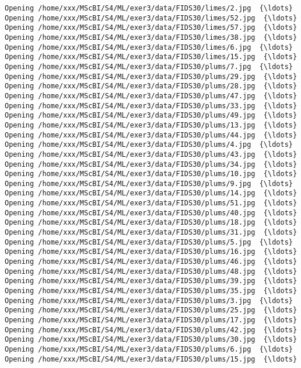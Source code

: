\documentclass[11pt]{article}
\begin{document}
\begin{Verbatim}[commandchars=\\\{\}]
Opening /home/xxx/MScBI/S4/ML/exer3/data/FIDS30/limes/2.jpg  {\ldots}
Opening /home/xxx/MScBI/S4/ML/exer3/data/FIDS30/limes/52.jpg  {\ldots}
Opening /home/xxx/MScBI/S4/ML/exer3/data/FIDS30/limes/57.jpg  {\ldots}
Opening /home/xxx/MScBI/S4/ML/exer3/data/FIDS30/limes/38.jpg  {\ldots}
Opening /home/xxx/MScBI/S4/ML/exer3/data/FIDS30/limes/6.jpg  {\ldots}
Opening /home/xxx/MScBI/S4/ML/exer3/data/FIDS30/limes/15.jpg  {\ldots}
Opening /home/xxx/MScBI/S4/ML/exer3/data/FIDS30/plums/7.jpg  {\ldots}
Opening /home/xxx/MScBI/S4/ML/exer3/data/FIDS30/plums/29.jpg  {\ldots}
Opening /home/xxx/MScBI/S4/ML/exer3/data/FIDS30/plums/28.jpg  {\ldots}
Opening /home/xxx/MScBI/S4/ML/exer3/data/FIDS30/plums/47.jpg  {\ldots}
Opening /home/xxx/MScBI/S4/ML/exer3/data/FIDS30/plums/33.jpg  {\ldots}
Opening /home/xxx/MScBI/S4/ML/exer3/data/FIDS30/plums/49.jpg  {\ldots}
Opening /home/xxx/MScBI/S4/ML/exer3/data/FIDS30/plums/13.jpg  {\ldots}
Opening /home/xxx/MScBI/S4/ML/exer3/data/FIDS30/plums/44.jpg  {\ldots}
Opening /home/xxx/MScBI/S4/ML/exer3/data/FIDS30/plums/4.jpg  {\ldots}
Opening /home/xxx/MScBI/S4/ML/exer3/data/FIDS30/plums/43.jpg  {\ldots}
Opening /home/xxx/MScBI/S4/ML/exer3/data/FIDS30/plums/34.jpg  {\ldots}
Opening /home/xxx/MScBI/S4/ML/exer3/data/FIDS30/plums/10.jpg  {\ldots}
Opening /home/xxx/MScBI/S4/ML/exer3/data/FIDS30/plums/9.jpg  {\ldots}
Opening /home/xxx/MScBI/S4/ML/exer3/data/FIDS30/plums/14.jpg  {\ldots}
Opening /home/xxx/MScBI/S4/ML/exer3/data/FIDS30/plums/51.jpg  {\ldots}
Opening /home/xxx/MScBI/S4/ML/exer3/data/FIDS30/plums/40.jpg  {\ldots}
Opening /home/xxx/MScBI/S4/ML/exer3/data/FIDS30/plums/18.jpg  {\ldots}
Opening /home/xxx/MScBI/S4/ML/exer3/data/FIDS30/plums/31.jpg  {\ldots}
Opening /home/xxx/MScBI/S4/ML/exer3/data/FIDS30/plums/5.jpg  {\ldots}
Opening /home/xxx/MScBI/S4/ML/exer3/data/FIDS30/plums/16.jpg  {\ldots}
Opening /home/xxx/MScBI/S4/ML/exer3/data/FIDS30/plums/46.jpg  {\ldots}
Opening /home/xxx/MScBI/S4/ML/exer3/data/FIDS30/plums/48.jpg  {\ldots}
Opening /home/xxx/MScBI/S4/ML/exer3/data/FIDS30/plums/39.jpg  {\ldots}
Opening /home/xxx/MScBI/S4/ML/exer3/data/FIDS30/plums/35.jpg  {\ldots}
Opening /home/xxx/MScBI/S4/ML/exer3/data/FIDS30/plums/3.jpg  {\ldots}
Opening /home/xxx/MScBI/S4/ML/exer3/data/FIDS30/plums/25.jpg  {\ldots}
Opening /home/xxx/MScBI/S4/ML/exer3/data/FIDS30/plums/17.jpg  {\ldots}
Opening /home/xxx/MScBI/S4/ML/exer3/data/FIDS30/plums/42.jpg  {\ldots}
Opening /home/xxx/MScBI/S4/ML/exer3/data/FIDS30/plums/30.jpg  {\ldots}
Opening /home/xxx/MScBI/S4/ML/exer3/data/FIDS30/plums/6.jpg  {\ldots}
Opening /home/xxx/MScBI/S4/ML/exer3/data/FIDS30/plums/15.jpg  {\ldots}

\end{Verbatim}
\end{document}
